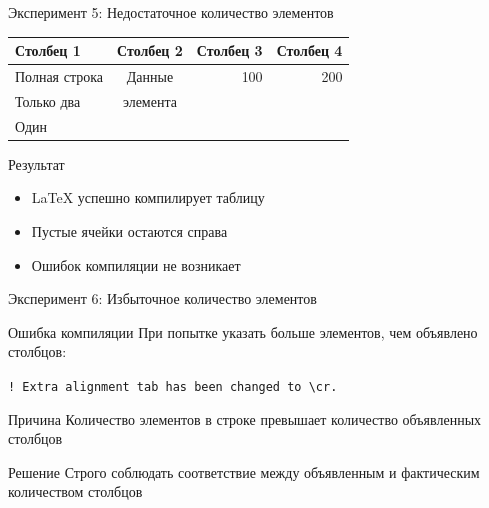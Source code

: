 \documentclass[aspectratio=169]{beamer}
\begin{document}
\begin{frame}{Эксперимент 5: Недостаточное количество элементов}
    \begin{center}
    \begin{tabular}{|l|c|r|r|}
    \hline
    \textbf{Столбец 1} & \textbf{Столбец 2} & \textbf{Столбец 3} & \textbf{Столбец 4} \\
    \hline
    Полная строка & Данные & 100 & 200 \\
    \hline
    Только два & элемента & & \\
    \hline
    Один & & & \\
    \hline
    \end{tabular}
    \end{center}
    
    \vspace{0.5cm}
    
    \begin{exampleblock}{Результат}
        \begin{itemize}
            \item LaTeX успешно компилирует таблицу
            \item Пустые ячейки остаются справа
            \item Ошибок компиляции не возникает
        \end{itemize}
    \end{exampleblock}
\end{frame}

\begin{frame}{Эксперимент 6: Избыточное количество элементов}
    \begin{alertblock}{Ошибка компиляции}
        При попытке указать больше элементов, чем объявлено столбцов:
        
        \vspace{0.3cm}
        
        \texttt{! Extra alignment tab has been changed to \textbackslash cr.}
    \end{alertblock}
    
    \vspace{0.5cm}
    
    \begin{block}{Причина}
        Количество элементов в строке превышает количество объявленных столбцов
    \end{block}
    
    \vspace{0.3cm}
    
    \begin{exampleblock}{Решение}
        Строго соблюдать соответствие между объявленным и фактическим количеством столбцов
    \end{exampleblock}
\end{frame}
\end{document}
